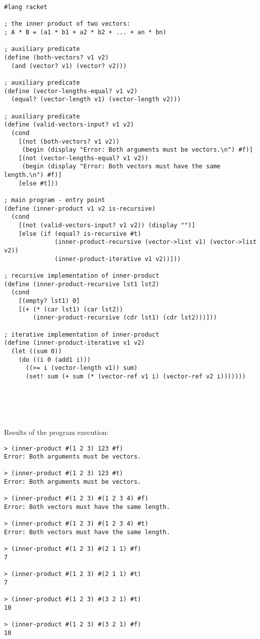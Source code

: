 \documentclass{article}
\begin{document}
\begin{verbatim} 
#lang racket

; the inner product of two vectors:
; A * B = (a1 * b1 + a2 * b2 + ... + an * bn)

; auxiliary predicate
(define (both-vectors? v1 v2)
  (and (vector? v1) (vector? v2)))

; auxiliary predicate
(define (vector-lengths-equal? v1 v2)
  (equal? (vector-length v1) (vector-length v2)))

; auxiliary predicate
(define (valid-vectors-input? v1 v2)
  (cond
    [(not (both-vectors? v1 v2))
     (begin (display "Error: Both arguments must be vectors.\n") #f)]
    [(not (vector-lengths-equal? v1 v2))
     (begin (display "Error: Both vectors must have the same length.\n") #f)]
    [else #t]))

; main program - entry point
(define (inner-product v1 v2 is-recursive)
  (cond
    [(not (valid-vectors-input? v1 v2)) (display "")]
    [else (if (equal? is-recursive #t)
              (inner-product-recursive (vector->list v1) (vector->list v2))
              (inner-product-iterative v1 v2))]))

; recursive implementation of inner-product
(define (inner-product-recursive lst1 lst2)
  (cond
    [(empty? lst1) 0]
    [(+ (* (car lst1) (car lst2))
        (inner-product-recursive (cdr lst1) (cdr lst2)))]))
  
; iterative implementation of inner-product
(define (inner-product-iterative v1 v2)
  (let ((sum 0))
    (do ((i 0 (add1 i)))
      ((>= i (vector-length v1)) sum)
      (set! sum (+ sum (* (vector-ref v1 i) (vector-ref v2 i)))))))
\end{verbatim}	

\paragraph{}\
\paragraph{}\

	Results of the program execution:
	
\begin{verbatim} 
> (inner-product #(1 2 3) 123 #f)
Error: Both arguments must be vectors.

> (inner-product #(1 2 3) 123 #t)
Error: Both arguments must be vectors.

> (inner-product #(1 2 3) #(1 2 3 4) #f)
Error: Both vectors must have the same length.

> (inner-product #(1 2 3) #(1 2 3 4) #t)
Error: Both vectors must have the same length.

> (inner-product #(1 2 3) #(2 1 1) #f)
7

> (inner-product #(1 2 3) #(2 1 1) #t)
7

> (inner-product #(1 2 3) #(3 2 1) #t)
10

> (inner-product #(1 2 3) #(3 2 1) #f)
10
\end{verbatim}
\end{document}
